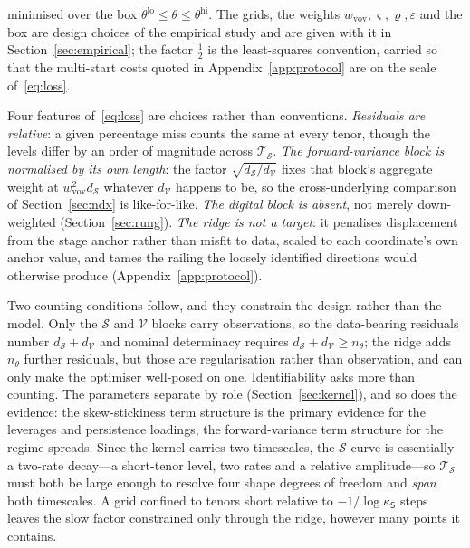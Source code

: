 \documentclass[11pt]{article}
\providecommand{\1}{\mathbf 1}
\begin{document}
minimised over the box $\theta^{\mathrm{lo}}\le\theta\le\theta^{\mathrm{hi}}$. The grids, the weights
$w_{\mathrm{vov}},\varsigma,\varrho,\varepsilon$ and the box are design choices of the empirical study and are
given with it in Section~\ref{sec:empirical}; the factor $\tfrac12$ is the least-squares convention,
carried so that the multi-start costs quoted in Appendix~\ref{app:protocol} are on the scale
of~\eqref{eq:loss}.

Four features of~\eqref{eq:loss} are choices rather than conventions. \emph{Residuals are
relative}: a given percentage miss counts the same at every tenor, though the levels differ by an
order of magnitude across $\mathcal{T}_{\mathcal{S}}$. \emph{The forward-variance block is normalised
by its own length}: the factor $\sqrt{d_{\mathcal{S}}/d_{\mathcal{V}}}$ fixes that block's aggregate
weight at $w_{\mathrm{vov}}^{2}d_{\mathcal{S}}$ whatever $d_{\mathcal{V}}$ happens to be, so the
cross-underlying comparison of Section~\ref{sec:ndx} is like-for-like. \emph{The digital block is
absent}, not merely down-weighted (Section~\ref{sec:rung}). \emph{The ridge is not a target}: it
penalises displacement from the stage anchor rather than misfit to data, scaled to each coordinate's
own anchor value, and tames the railing the loosely identified directions would otherwise produce
(Appendix~\ref{app:protocol}).

Two counting conditions follow, and they constrain the design rather than the model. Only the
$\mathcal S$ and $\mathcal V$ blocks carry observations, so the data-bearing residuals number
$d_{\mathcal{S}}+d_{\mathcal{V}}$ and nominal determinacy requires
$d_{\mathcal{S}}+d_{\mathcal{V}}\ge n_\theta$; the ridge adds $n_\theta$ further residuals, but those
are regularisation rather than observation, and can only make
the optimiser well-posed on one. Identifiability asks more than counting. The parameters separate by
role (Section~\ref{sec:kernel}), and so does the evidence: the skew-stickiness term structure is the
primary evidence for the leverages and persistence loadings, the forward-variance term structure for
the regime spreads. Since the kernel carries two timescales, the $\mathcal S$ curve is essentially a
two-rate decay---a short-tenor level, two rates and a relative amplitude---so $\mathcal{T}_{\mathcal{S}}$
must both be large enough to resolve four shape degrees of freedom and \emph{span} both timescales.
A grid confined to tenors short relative to $-1/\log\kappa_{\mathsf S}$ steps leaves the slow factor
constrained only through the ridge, however many points it contains.
\end{document}
